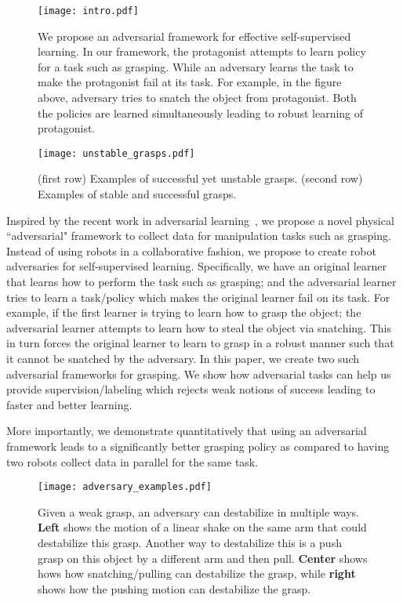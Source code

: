 \documentclass[letterpaper, 10 pt, conference]{ieeeconf}  %
\begin{document}
\begin{figure}[t!]
\begin{center}
\texttt{[image: intro.pdf]}
\end{center}
\caption{We propose an adversarial framework for effective self-supervised learning. In our framework, the protagonist attempts to learn policy for a task such as grasping. While an adversary learns the task to make the protagonist fail at its task. For example, in the figure above, adversary tries to snatch the object from protagonist. Both the policies are learned simultaneously leading to robust learning of protagonist.}
\label{fig:intro_fig}
\end{figure}\begin{figure}[t!]
\begin{center}
\texttt{[image: unstable\_grasps.pdf]}
\end{center}
\caption{ (first row) Examples of successful yet unstable grasps. (second row) Examples of stable and successful grasps.}
\label{fig:unstable}
\end{figure}

Inspired by the recent work in adversarial learning~\cite{goodfellow2014generative, dumoulin2016adversarially}, we propose a novel physical ``adversarial" framework to collect data for manipulation tasks such as grasping. Instead of using robots in a collaborative fashion, we propose to create robot adversaries for self-supervised learning. Specifically, we have an original learner that learns how to perform the task such as grasping; and the adversarial learner tries to learn a task/policy which makes the original learner fail on its task. For example, if the first learner is trying to learn how to grasp the object; the adversarial learner attempts to learn how to steal the object via snatching. This in turn forces the original learner to learn to grasp in a robust manner such that it cannot be snatched by the adversary. In this paper, we create two such adversarial frameworks for grasping. We show how adversarial tasks can help us provide supervision/labeling which rejects weak notions of success leading to faster and better learning.

More importantly, we demonstrate quantitatively that using an adversarial framework leads to a significantly better grasping policy as compared to having two robots collect data in parallel for the same task. 

\begin{figure*}[t!]
\begin{center}
\texttt{[image: adversary\_examples.pdf]}
\end{center}
\vspace{-0.1in}
\caption{Given a weak grasp, an adversary can destabilize in multiple ways. \textbf{Left} shows the motion of a linear shake on the same arm that could destabilize this grasp. Another way to destabilize this is a push grasp on this object by a different arm and then pull. \textbf{Center} shows hows how snatching/pulling can destabilize the grasp, while \textbf{right} shows how the pushing motion can destabilize the grasp.}
\vspace{-0.2in}
\label{fig:framework_fig}
\end{figure*}
\end{document}
